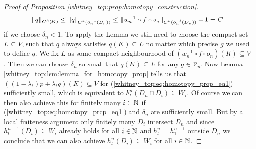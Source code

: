 \begin{proof}[Proof of Proposition \ref{whitney_top:prop:homotopy_construction}]
    $$\lVert q\rVert_{C^k(K)} \leq \lVert q\rVert_{C^k(o_n^{-1}(D_n))} \leq \lVert w_n^{-1} \circ f \circ o_n\rVert_{C^k(o_n^{-1}(D_n))} + 1 = C$$ 
    if we choose $\delta_n < 1$. To apply the Lemma we still need to choose the compact set $L \subseteq V$, such that $q$ always satisfies $q(K) \subseteq L$ no matter which precise $g$ we used to define $q$. We fix $L$ as some compact neighbourhood of $(w_n^{-1} \circ f \circ o_n)(K) \subseteq V$. Then we can choose $\delta_n$ so small that $q(K) \subseteq L$ for any $g \in \mathcal{V}_n$. Now Lemma \ref{whitney_top:lem:lemma_for_homotopy_prop} tells us that $((1-\lambda_t)p + \lambda_t q)(K) \subseteq V$ for (\ref{whitney_top:eq:homotopy_prop_eq1}) sufficiently small, which is equivalent to $h_t^n(D_n \cap D_i) \subseteq W_i$. Of course we can then also achieve this for finitely many $i \in \mathbb{N}$ if (\ref{whitney_top:eq:homotopy_prop_eq1}) and $\delta_n$ are sufficiently small. But by a local finiteness argument only finitely many $D_i$ intersect $D_n$ and since $h_t^{n-1}(D_i) \subseteq W_i$ already holds for all $i \in \mathbb{N}$ and $h_t^{n} = h_1^{n-1}$ outside $D_n$ we conclude that we can also achieve $h_t^{n}(D_i) \subseteq W_i$ for all $i \in \mathbb{N}$.  


\end{proof}
